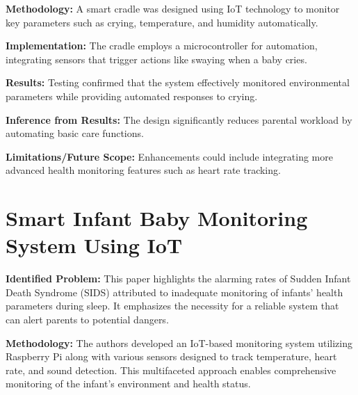 \documentclass[12pt,a4paper]{report}
\begin{document}
\setlength{\parskip}{1em}  %


\noindent\textbf{Methodology:} A smart cradle was designed using IoT technology to monitor key parameters such as crying, temperature, and humidity automatically.

\setlength{\parskip}{1em}  %


\noindent\textbf{Implementation:}  The cradle employs a microcontroller for automation, integrating sensors that trigger actions like swaying when a baby cries.
\setlength{\parskip}{1em}  %

\noindent\textbf{Results:} Testing confirmed that the system effectively monitored environmental parameters while providing automated responses to crying.

\setlength{\parskip}{1em}  %


\noindent\textbf{Inference from Results:} The design significantly reduces parental workload by automating basic care functions.


\setlength{\parskip}{1em}  %

\noindent\textbf{Limitations/Future Scope:} Enhancements could include integrating more advanced health monitoring features such as heart rate tracking.
\setlength{\parskip}{1em}  %



\section{Smart Infant Baby Monitoring System Using IoT}
\textbf{Identified Problem:} This paper highlights the alarming rates of Sudden Infant Death Syndrome (SIDS) attributed to inadequate monitoring of infants' health parameters during sleep. It emphasizes the necessity for a reliable system that can alert parents to potential dangers\cite{Kumar2023}.

\setlength{\parskip}{1em}  %


\noindent\textbf{Methodology:} The authors developed an IoT-based monitoring system utilizing Raspberry Pi along with various sensors designed to track temperature, heart rate, and sound detection. This multifaceted approach enables comprehensive monitoring of the infant's environment and health status.

\setlength{\parskip}{1em}  %
\end{document}

